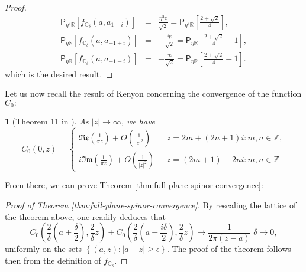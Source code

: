 \documentclass[oneside,english]{amsart}
\numberwithin{equation}{section}
\numberwithin{figure}{section}
\theoremstyle{plain}
\theoremstyle{plain}
\newtheorem{thm}{\protect\theoremname}
\theoremstyle{plain}
\theoremstyle{plain}
\theoremstyle{plain}
\theoremstyle{definition}
\theoremstyle{remark}
\providecommand{\theoremname}{Theorem}
\providecommand{\theoremname}{Theorem}
\begin{document}
\begin{proof}
\begin{eqnarray*}
\mathsf{P}_{\eta^{3}\mathbb{R}}\left[f_{\mathbb{C}_{\delta}}\left(a,a_{1-i}\right)\right] & = & \frac{\eta^{3}\mathrm{c}}{\sqrt{2}}=\mathsf{P}_{\eta^{3}\mathbb{R}}\left[\frac{2+\sqrt{2}}{4}\right],\\
\mathsf{P}_{\overline{\eta}\mathbb{R}}\left[f_{\mathbb{C}_{\delta}}\left(a,a_{-1+i}\right)\right] & = & -\frac{\overline{\eta}\mathrm{s}}{\sqrt{2}}=\mathsf{P}_{\overline{\eta}\mathbb{R}}\left[\frac{2+\sqrt{2}}{4}-1\right],\\
\mathsf{P}_{\eta\mathbb{R}}\left[f_{\mathbb{C}_{\delta}}\left(a,a_{-1-i}\right)\right] & = & -\frac{\eta\mathrm{s}}{\sqrt{2}}=\mathsf{P}_{\eta\mathbb{R}}\left[\frac{2+\sqrt{2}}{4}-1\right].
\end{eqnarray*}
which is the desired result.
\end{proof}
Let us now recall the result of Kenyon concerning the convergence
of the function $C_{0}:$
\begin{thm}[Theorem 11 in \cite{kenyon-i}]
\label{thm:kenyon-cv-theorem}As $\left|z\right|\to\infty$, we have
\[
C_{0}\left(0,z\right)=\begin{cases}
\Re\mathfrak{e}\left(\frac{1}{\pi z}\right)+O\left(\frac{1}{\left|z\right|^{2}}\right) & \,\,\,\, z=2m+\left(2n+1\right)i:m,n\in\mathbb{Z},\\
i\Im\mathfrak{m}\left(\frac{1}{\pi z}\right)+O\left(\frac{1}{\left|z\right|^{2}}\right) & \,\,\,\, z=\left(2m+1\right)+2ni:m,n\in\mathbb{Z}
\end{cases}
\]

\end{thm}
From there, we can prove Theorem \ref{thm:full-plane-spinor-convergence}:
\begin{proof}[Proof of Theorem \ref{thm:full-plane-spinor-convergence}]
By rescaling the lattice of the theorem above, one readily deduces
that 
\[
C_{0}\left(\frac{2}{\delta}\left(a+\frac{\delta}{2}\right),\frac{2}{\delta}z\right)+C_{0}\left(\frac{2}{\delta}\left(a-\frac{i\delta}{2}\right),\frac{2}{\delta}z\right)\longrightarrow\frac{1}{2\pi\left(z-a\right)}\,\,\delta\to0,
\]
uniformly on the sets $\left\{ \left(a,z\right):\left|a-z\right|\geq\epsilon\right\} $.
The proof of the theorem follows then from the definition of $f_{\mathbb{C}_{\delta}}$.\end{proof}
\end{document}

